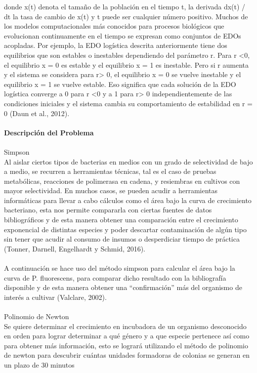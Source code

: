 \documentclass[12pt,a4paper]{article}
\begin{document}
    donde x(t) denota el tamaño de la población en el tiempo t, la derivada dx(t) / dt la tasa de cambio de x(t) y t puede ser cualquier número positivo. 
    Muchos de los modelos computacionales más conocidos para procesos biológicos que evolucionan continuamente en el tiempo se expresan como conjuntos de EDOs acopladas. Por ejemplo, la EDO logística descrita anteriormente tiene dos equilibrios que son estables o inestables dependiendo del parámetro r. Para r <0, el equilibrio x = 0 es estable y el equilibrio x = 1 es inestable. Pero si r aumenta y el sistema se considera para r> 0, el equilibrio x = 0 se vuelve inestable y el equilibrio x = 1 se vuelve estable. Eso significa que cada solución de la EDO logística converge a 0 para r <0 y a 1 para r> 0 independientemente de las condiciones iniciales y el sistema cambia su comportamiento de estabilidad en r = 0 (Daun et al., 2012).  \\\\
    \textbf{Descripción del Problema}\\ \\
    Simpson\\
    Al aislar ciertos tipos de bacterias en medios con un grado de selectividad de bajo a medio, se recurren a herramientas técnicas, tal es el caso de pruebas metabólicas, reacciones de polimerasa en cadena, y resiembras en cultivos con mayor selectividad. En muchos casos, se pueden acudir a herramientas informáticas para llevar a cabo cálculos como el área bajo la curva de crecimiento bacteriano, esta nos permite compararla con ciertas fuentes de datos bibliográficos y de esta manera obtener una comparación entre el crecimiento exponencial de distintas especies y poder descartar contaminación de algún tipo sin tener que acudir al consumo de insumos o desperdiciar tiempo de práctica (Tonner, Darnell, Engelhardt y Schmid, 2016).\\\\
    A continuación se hace uso del método simpson para calcular el área bajo la curva de P. fluorescens, para comparar dicho resultado con la bibliografía disponible y de esta manera obtener una “confirmación” más del organismo de interés a cultivar (Valclare, 2002). \\\\
    Polinomio de Newton\\ Se quiere determinar el crecimiento en incubadora de un organismo desconocido en orden para lograr determinar a qué género y a que especie pertenece así como para obtener más información, esto se logrará utilizando el método de polinomio de newton para descubrir cuántas unidades formadoras de colonias se generan en un plazo de 30 minutos\\\\
\end{document}

